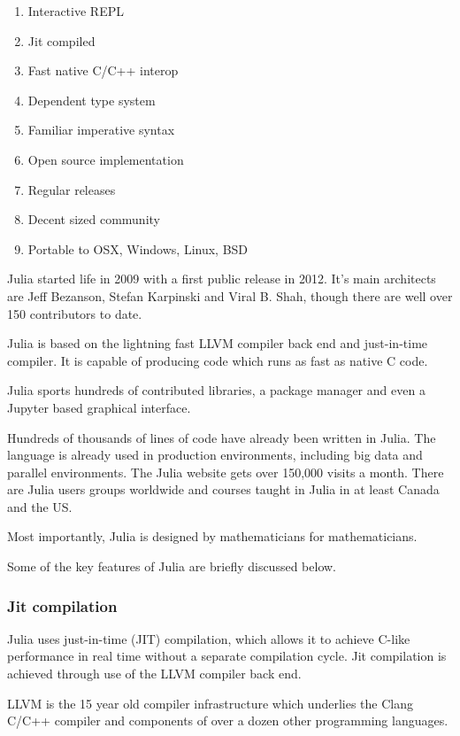 \documentclass[a4paper,10pt]{article}
\begin{document}
\begin{enumerate}
\item Interactive REPL
\item Jit compiled
\item Fast native C/C++ interop
\item Dependent type system
\item Familiar imperative syntax
\item Open source implementation
\item Regular releases
\item Decent sized community
\item Portable to OSX, Windows, Linux, BSD 
\end{enumerate}

Julia started life in 2009 with a first public release in 2012. It's main architects are Jeff Bezanson,
Stefan Karpinski and Viral B. Shah, though there are well over 150 contributors to date.

Julia is based on the lightning fast LLVM compiler back end and just-in-time compiler. It is capable of
producing code which runs as fast as native C code.

Julia sports hundreds of contributed libraries, a package manager and even a Jupyter based graphical
interface.

Hundreds of thousands of lines of code have already been written in Julia. The language is
already used in production environments, including big data and parallel environments. The
Julia website gets over 150,000 visits a month. There are Julia users groups worldwide and
courses taught in Julia in at least Canada and the US.

Most importantly, Julia is designed by mathematicians for mathematicians.

Some of the key features of Julia are briefly discussed below.

\subsubsection{Jit compilation}

Julia uses just-in-time (JIT) compilation, which allows it to achieve C-like performance in real time
without a separate compilation cycle. Jit compilation is achieved through use of the LLVM compiler
back end.

LLVM is the 15 year old compiler infrastructure which underlies the Clang C/C++ compiler and components
of over a dozen other programming languages.
\end{document}
